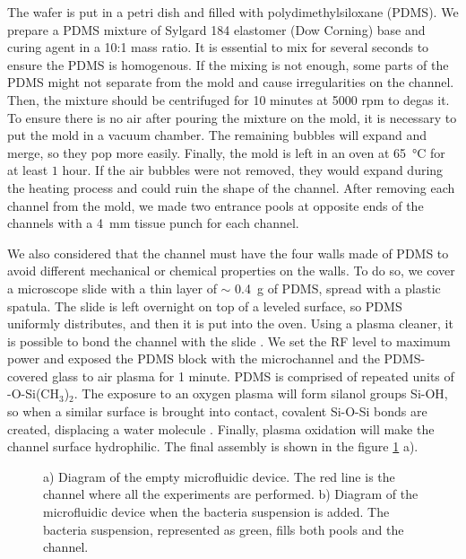 The wafer is put in a petri dish and filled with polydimethylsiloxane (PDMS). We prepare a PDMS mixture of Sylgard 184 elastomer (Dow Corning) base and curing agent in a 10:1 mass ratio. It is essential to mix for several seconds to ensure the PDMS is homogenous. If the mixing is not enough, some parts of the PDMS might not separate from the mold and cause irregularities on the channel. Then, the mixture should be centrifuged for 10 minutes at 5000 rpm to degas it. To ensure there is no air after pouring the mixture on the mold, it is necessary to put the mold in a vacuum chamber. The remaining bubbles will expand and merge, so they pop more easily. Finally, the mold is left in an oven at \SI{65}{\degreeCelsius} for at least $1$ hour. If the air bubbles were not removed, they would expand during the heating process and could ruin the shape of the channel. After removing each channel from the mold, we made two entrance pools at opposite ends of the channels with a \SI{4}{\milli\meter} tissue punch for each channel.

We also considered that the channel must have the four walls made of PDMS to avoid different mechanical or chemical properties on the walls. To do so, we cover a microscope slide with a thin layer of $\sim$ \SI{0.4}{\gram} of PDMS, spread with a plastic spatula. The slide is left overnight on top of a leveled surface, so PDMS uniformly distributes, and then it is put into the oven. Using a plasma cleaner, it is possible to bond the channel with the slide \cite{Henry2015ScholarlyCommonsProtocol-Technics}. We set the RF level to maximum power and exposed the PDMS block with the microchannel and the PDMS-covered glass to air plasma for 1 minute. PDMS is comprised of repeated units of -O-Si(CH$_3$)$_2$. The exposure to an oxygen plasma will form silanol groups Si-OH, so when a similar surface is brought into contact, covalent Si-O-Si bonds are created, displacing a water molecule \cite{Koh2012QuantitativeEffect}. Finally, plasma oxidation will make the channel surface hydrophilic. The final assembly is shown in the figure \ref{experimental_setup} a). 

\begin{figure}[H]
	\centering
	
	\caption[Microfluidic device diagram]{a) Diagram of the empty microfluidic device. The red line is the channel where all the experiments are performed. b) Diagram of the microfluidic device when the bacteria suspension is added. The bacteria suspension, represented as green, fills both pools and the channel.}
	\label{experimental_setup}
\end{figure}

